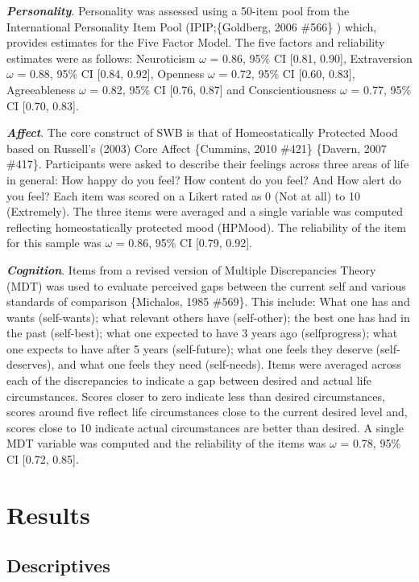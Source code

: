 \documentclass[man,floatsintext]{apa6}
\begin{document}
\textbf{\emph{Personality}}. Personality was assessed using a 50-item
pool from the International Personality Item Pool (IPIP;\{Goldberg, 2006
\#566\} ) which, provides estimates for the Five Factor Model. The five
factors and reliability estimates were as follows: Neuroticism
\(\omega\) = 0.86, 95\% CI {[}0.81, 0.90{]}, Extraversion \(\omega\) =
0.88, 95\% CI {[}0.84, 0.92{]}, Openness \(\omega\) = 0.72, 95\% CI
{[}0.60, 0.83{]}, Agreeableness \(\omega\) = 0.82, 95\% CI {[}0.76,
0.87{]} and Conscientiousness \(\omega\) = 0.77, 95\% CI {[}0.70,
0.83{]}.

\textbf{\emph{Affect}}. The core construct of SWB is that of
Homeostatically Protected Mood based on Russell's (2003) Core Affect
\{Cummins, 2010 \#421\} \{Davern, 2007 \#417\}. Participants were asked
to describe their feelings across three areas of life in general: How
happy do you feel? How content do you feel? And How alert do you feel?
Each item was scored on a Likert rated as 0 (Not at all) to 10
(Extremely). The three items were averaged and a single variable was
computed reflecting homeostatically protected mood (HPMood). The
reliability of the item for this sample was \(\omega\) = 0.86, 95\% CI
{[}0.79, 0.92{]}.

\textbf{\emph{Cognition}}. Items from a revised version of Multiple
Discrepancies Theory (MDT) was used to evaluate perceived gaps between
the current self and various standards of comparison \{Michalos, 1985
\#569\}. This include: What one has and wants (self-wants); what
relevant others have (self-other); the best one has had in the past
(self-best); what one expected to have 3 years ago (selfprogress); what
one expects to have after 5 years (self-future); what one feels they
deserve (self-deserves), and what one feels they need (self-needs).
Items were averaged across each of the discrepancies to indicate a gap
between desired and actual life circumstances. Scores closer to zero
indicate less than desired circumstances, scores around five reflect
life circumstances close to the current desired level and, scores close
to 10 indicate actual circumstances are better than desired. A single
MDT variable was computed and the reliability of the items was
\(\omega\) = 0.78, 95\% CI {[}0.72, 0.85{]}.

\section{Results}\label{results}

\subsection{Descriptives}\label{descriptives}
\end{document}
